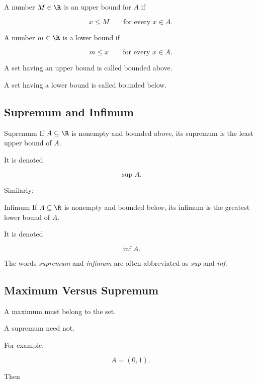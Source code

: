 A number \(M\in\R\) is an upper bound for \(A\) if

\[
\boxed{
x\leq M
\qquad
\text{for every }x\in A.
}
\]

A number \(m\in\R\) is a lower bound if

\[
\boxed{
m\leq x
\qquad
\text{for every }x\in A.
}
\]

A set having an upper bound is called bounded above.

A set having a lower bound is called bounded below.

\subsection{Supremum and Infimum}
\label{subsec:supremum-infimum}

\begin{definitionbox}{Supremum}
If \(A\subseteq\R\) is nonempty and bounded above, its supremum is the
least upper bound of \(A\).

It is denoted

\[
\boxed{
\sup A.
}
\]
\end{definitionbox}

Similarly:

\begin{definitionbox}{Infimum}
If \(A\subseteq\R\) is nonempty and bounded below, its infimum is the
greatest lower bound of \(A\).

It is denoted

\[
\boxed{
\inf A.
}
\]
\end{definitionbox}

The words \emph{supremum} and \emph{infimum} are often abbreviated as
\emph{sup} and \emph{inf}.

\subsection{Maximum Versus Supremum}
\label{subsec:maximum-versus-supremum}

A maximum must belong to the set.

A supremum need not.

For example,

\[
A=(0,1).
\]

Then

